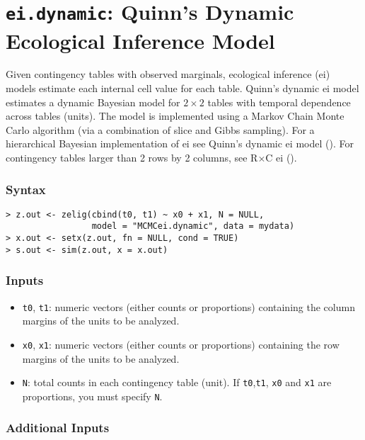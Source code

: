 \section{\texttt{ei.dynamic}: Quinn's Dynamic Ecological Inference
Model}

\label{ei.dynamic}

Given contingency tables with observed marginals, ecological inference
({\sc ei}) models estimate each internal cell value for each table.
Quinn's dynamic {\sc ei} model estimates a dynamic Bayesian model for
$2 \times 2$ tables with temporal dependence across tables (units).
The model is implemented using a Markov Chain Monte Carlo algorithm
(via a combination of slice and Gibbs sampling).  
For a hierarchical Bayesian implementation of {\sc ei} see Quinn's
dynamic {\sc ei} model (). For contingency tables larger than
2 rows by 2 columns, see R$\times$C {\sc ei} (). 

\subsubsection{Syntax}
\begin{verbatim}
> z.out <- zelig(cbind(t0, t1) ~ x0 + x1, N = NULL, 
                 model = "MCMCei.dynamic", data = mydata)
> x.out <- setx(z.out, fn = NULL, cond = TRUE)
> s.out <- sim(z.out, x = x.out)
\end{verbatim}

\subsubsection{Inputs}
\begin{itemize}
\item \texttt{t0}, {\tt t1}: numeric vectors (either counts or
proportions) containing the column margins of the units to be
analyzed.

\item \texttt{x0}, {\tt x1}: numeric vectors (either counts or
proportions) containing the row margins of the units to be
analyzed.

\item \texttt{N}: total counts in each contingency table (unit).  If
\texttt{t0},\texttt{t1}, \texttt{x0} and \texttt{x1} are proportions,
you must specify \texttt{N}.

\end{itemize}

\subsubsection{Additional Inputs}

